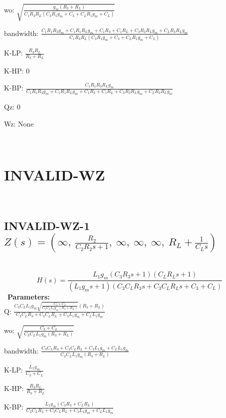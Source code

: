 \documentclass{article}
\begin{document}
wo: $\sqrt{\frac{g_{m} \left(R_{3} + R_{L}\right)}{C_{1} R_{3} R_{L} \left(C_{3} R_{1} g_{m} + C_{3} + C_{L} R_{1} g_{m} + C_{L}\right)}}$\ 

bandwidth: $\frac{C_{1} R_{1} R_{3} g_{m} + C_{1} R_{1} R_{L} g_{m} + C_{1} R_{3} + C_{1} R_{L} + C_{3} R_{3} R_{L} g_{m} + C_{L} R_{3} R_{L} g_{m}}{C_{1} R_{3} R_{L} \left(C_{3} R_{1} g_{m} + C_{3} + C_{L} R_{1} g_{m} + C_{L}\right)}$\ 

K-LP: $\frac{R_{3} R_{L}}{R_{3} + R_{L}}$\ 

K-HP: $0$\ 

K-BP: $\frac{C_{1} R_{1} R_{3} R_{L} g_{m}}{C_{1} R_{1} R_{3} g_{m} + C_{1} R_{1} R_{L} g_{m} + C_{1} R_{3} + C_{1} R_{L} + C_{3} R_{3} R_{L} g_{m} + C_{L} R_{3} R_{L} g_{m}}$\ 

Qz: $0$\ 

Wz: $\text{None}$\ 

\ 

\section{INVALID-WZ}\ 
\subsection{INVALID-WZ-1 $Z(s) = \left( \infty, \  \frac{R_{2}}{C_{2} R_{2} s + 1}, \  \infty, \  \infty, \  \infty, \  R_{L} + \frac{1}{C_{L} s}\right)$ } \ 
\textbf{\[H(s) = \frac{L_{1} g_{m} \left(C_{3} R_{3} s + 1\right) \left(C_{L} R_{L} s + 1\right)}{\left(L_{1} g_{m} s + 1\right) \left(C_{3} C_{L} R_{3} s + C_{3} C_{L} R_{L} s + C_{3} + C_{L}\right)}\] } \ 
\textbf{Parameters:}\\ 

Q: $\frac{C_{3} C_{L} L_{1} g_{m} \sqrt{\frac{C_{3} + C_{L}}{C_{3} C_{L} L_{1} g_{m} \left(R_{3} + R_{L}\right)}} \left(R_{3} + R_{L}\right)}{C_{3} C_{L} R_{3} + C_{3} C_{L} R_{L} + C_{3} L_{1} g_{m} + C_{L} L_{1} g_{m}}$\ 

wo: $\sqrt{\frac{C_{3} + C_{L}}{C_{3} C_{L} L_{1} g_{m} \left(R_{3} + R_{L}\right)}}$\ 

bandwidth: $\frac{C_{3} C_{L} R_{3} + C_{3} C_{L} R_{L} + C_{3} L_{1} g_{m} + C_{L} L_{1} g_{m}}{C_{3} C_{L} L_{1} g_{m} \left(R_{3} + R_{L}\right)}$\ 

K-LP: $\frac{L_{1} g_{m}}{C_{3} + C_{L}}$\ 

K-HP: $\frac{R_{3} R_{L}}{R_{3} + R_{L}}$\ 

K-BP: $\frac{L_{1} g_{m} \left(C_{3} R_{3} + C_{L} R_{L}\right)}{C_{3} C_{L} R_{3} + C_{3} C_{L} R_{L} + C_{3} L_{1} g_{m} + C_{L} L_{1} g_{m}}$\ 
\end{document}
